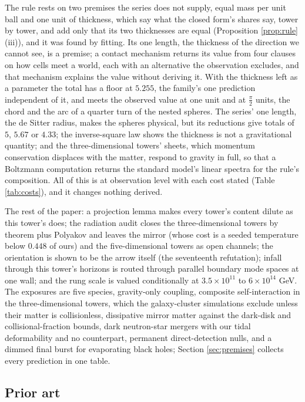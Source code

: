 \documentclass[11pt]{article}
\theoremstyle{definition}
\begin{document}
The rule rests on two premises the series does not supply, equal mass per unit ball and one unit of thickness, which say what the closed form's shares say, tower by tower, and add only that its two thicknesses are equal (Proposition \ref{prop:rule}(iii)), and it was found by fitting. Its one length, the thickness of the direction we cannot see, is a premise; a contact mechanism returns its value from four clauses on how cells meet a world, each with an alternative the observation excludes, and that mechanism explains the value without deriving it. With the thickness left as a parameter the total has a floor at $5.255$, the family's one prediction independent of it, and meets the observed value at one unit and at $\tfrac{\pi}{2}$ units, the chord and the arc of a quarter turn of the nested spheres. The series' one length, the de Sitter radius, makes the spheres physical, but its reductions give totals of $5$, $5.67$ or $4.33$; the inverse-square law shows the thickness is not a gravitational quantity; and the three-dimensional towers' sheets, which momentum conservation displaces with the matter, respond to gravity in full, so that a Boltzmann computation returns the standard model's linear spectra for the rule's composition. All of this is at observation level with each cost stated (Table \ref{tab:costs}), and it changes nothing derived.

The rest of the paper: a projection lemma makes every tower's content dilute as this tower's does; the radiation audit closes the three-dimensional towers by theorem plus Polyakov and leaves the mirror (whose cost is a seeded temperature below $0.448$ of ours) and the five-dimensional towers as open channels; the orientation is shown to be the arrow itself (the seventeenth refutation); infall through this tower's horizons is routed through parallel boundary mode spaces at one wall; and the rung scale is valued conditionally at $3.5 \times 10^{11}$ to $6 \times 10^{14}$ GeV. The exposures are five species, gravity-only coupling, composite self-interaction in the three-dimensional towers, which the galaxy-cluster simulations exclude unless their matter is collisionless, dissipative mirror matter against the dark-disk and collisional-fraction bounds, dark neutron-star mergers with our tidal deformability and no counterpart, permanent direct-detection nulls, and a dimmed final burst for evaporating black holes; Section \ref{sec:premises} collects every prediction in one table.

\subsection*{Prior art}
\end{document}
